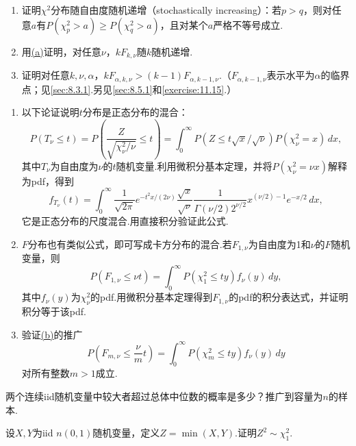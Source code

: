 \begin{exercise}\label{exercise:5.19}\leavevmode
\begin{enumerate}[label=(\alph*)]
\item{}\label{itm:exercise:5.19:a} 证明$\chi^2$分布随自由度随机递增（stochastically increasing）：若$p>q$，则对任意$a$有$P(\chi_p^2>a)\ge P(\chi_q^2>a)$，且对某个$a$严格不等号成立.
\item 用\hyperref[itm:exercise:5.19:a]{(a)}证明，对任意$\nu$，$kF_{k,\nu}$随$k$随机递增.
\item 证明对任意$k,\nu,\alpha$，$kF_{\alpha,k,\nu}>(k-1)F_{\alpha,k-1,\nu}$.（$F_{\alpha,k-1,\nu}$表示水平为$\alpha$的临界点；见\autoref{sec:8.3.1}.另见\autoref{sec:8.5.1}和\autoref{exercise:11.15}.）
\end{enumerate}
\end{exercise}
\begin{exercise}\label{exercise:5.20}\leavevmode
\begin{enumerate}[label=(\alph*)]
\item 以下论证说明$t$分布是正态分布的混合：
$$P(T_\nu\le t)=P\left(\frac Z{\sqrt{\chi_\nu^2/\nu}}\le t\right)=\int_0^\infty P(Z\le t\sqrt x/\sqrt\nu)P(\chi_\nu^2=x)\,dx,$$
其中$T_\nu$为自由度为$\nu$的$t$随机变量.利用微积分基本定理，并将$P(\chi_\nu^2=\nu x)$解释为pdf，得到
$$f_{T_\nu}(t)=\int_0^\infty\frac1{\sqrt{2\pi}}e^{-t^2x/(2\nu)}\frac{\sqrt x}{\sqrt\nu}\frac1{\Gamma(\nu/2)2^{\nu/2}}x^{(\nu/2)-1}e^{-x/2}\,dx,$$
它是正态分布的尺度混合.用直接积分验证此公式.
\item{}\label{itm:exercise:5.20:b} $F$分布也有类似公式，即可写成卡方分布的混合.若$F_{1,\nu}$为自由度为1和$\nu$的$F$随机变量，则
$$P(F_{1,\nu}\le\nu t)=\int_0^\infty P(\chi_1^2\le ty)f_\nu(y)\,dy,$$
其中$f_\nu(y)$为$\chi_\nu^2$的pdf.用微积分基本定理得到$F_{1,\nu}$的pdf的积分表达式，并证明积分等于该pdf.
\item 验证\hyperref[itm:exercise:5.20:b]{(b)}的推广
$$P\left(F_{m,\nu}\le\frac\nu m t\right)=\int_0^\infty P(\chi_m^2\le ty)f_\nu(y)\,dy$$
对所有整数$m>1$成立.
\end{enumerate}
\end{exercise}
\begin{exercise}\label{exercise:5.21}
两个连续iid随机变量中较大者超过总体中位数的概率是多少？推广到容量为$n$的样本.
\end{exercise}
\begin{exercise}\label{exercise:5.22}
设$X,Y$为iid $n(0,1)$随机变量，定义$Z=\min(X,Y)$.证明$Z^2\sim\chi_1^2$.
\end{exercise}
